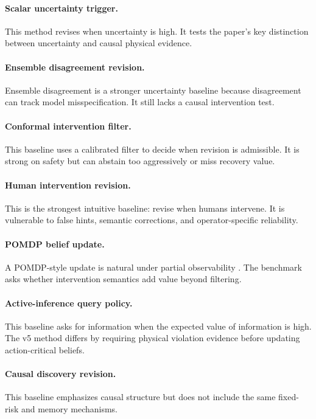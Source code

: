 \documentclass{article}
\begin{document}
\paragraph{Scalar uncertainty trigger.} This method revises when uncertainty is high. It tests the paper's key distinction between uncertainty and causal physical evidence.

\paragraph{Ensemble disagreement revision.} Ensemble disagreement is a stronger uncertainty baseline because disagreement can track model misspecification. It still lacks a causal intervention test.

\paragraph{Conformal intervention filter.} This baseline uses a calibrated filter to decide when revision is admissible. It is strong on safety but can abstain too aggressively or miss recovery value.

\paragraph{Human intervention revision.} This is the strongest intuitive baseline: revise when humans intervene. It is vulnerable to false hints, semantic corrections, and operator-specific reliability.

\paragraph{POMDP belief update.} A POMDP-style update is natural under partial observability \citep{kaelbling1998pomdp,ross2008pomdp}. The benchmark asks whether intervention semantics add value beyond filtering.

\paragraph{Active-inference query policy.} This baseline asks for information when the expected value of information is high. The v5 method differs by requiring physical violation evidence before updating action-critical beliefs.

\paragraph{Causal discovery revision.} This baseline emphasizes causal structure but does not include the same fixed-risk and memory mechanisms.
\end{document}
